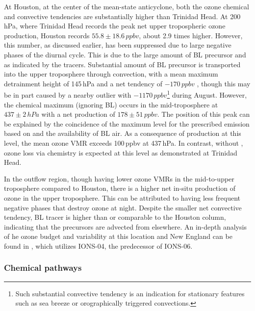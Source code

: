 At Houston, at the center of the mean-state anticyclone, both the ozone chemical and convective tendencies are substantially higher than Trinidad Head.
At 200\,\unit{hPa}, where Trinidad Head records the peak net upper tropospheric ozone production, Houston records $55.8\pm18.6\,\unit{ppbv}$, about
2.9 times higher. However, this number, as discussed earlier, has been suppressed due to large negative phases of the diurnal cycle. This is due to the
large amount of BL precursor and {\lnox} as indicated by the tracers. Substantial amount of BL precursor is transported into the upper troposphere through
convection, with a mean maximum detrainment height of 145\,\unit{hPa} and a net tendency of $-170\,\unit{ppbv}$ , though this may be in part
caused by  a nearby outlier with $-1170\,\unit{ppbv}$\footnote{Such substantial convective tendency is an indication for stationary features such as sea
breeze or orographically triggered convections.} during August. However, the chemical maximum (ignoring BL) occurs in the mid-troposphere at
$437\pm2\,\unit{hPa}$ with a net production of $178\pm51\,\unit{ppbv}$. The position of this peak can be explained by the coincidence of the maximum
level for the prescribed {\lnox} emission based on \citet{Ott:2010lo} and the availability of BL air. As a consequence of production at this level, the mean
ozone VMR exceeds 100\,\unit{ppbv} at 437\,\unit{hPa}. In contrast, without {\lnox}, ozone loss via chemistry is expected at this level as
demonstrated at Trinidad Head.

In the outflow region, though having lower ozone VMRs in the mid-to-upper troposphere compared to Houston, there is a higher net in-situ production of
ozone in the upper troposphere. This can be attributed to having less frequent negative phases that destroy ozone at night. Despite the smaller net
convective tendency, BL tracer is higher than or comparable to the Houston column, indicating that the precursors are advected from elsewhere. An
in-depth analysis of he ozone budget and variability at this location and New England can be found in \citet{Thompson:2007gd,Thompson:2007ov}, which 
utilizes IONS-04, the predecessor of IONS-06.

\subsubsection{Chemical pathways}

